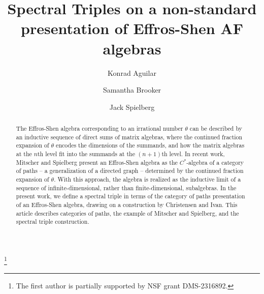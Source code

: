 \documentclass[12pt]{amsart}
\theoremstyle{plain} %
\theoremstyle{definition} %
\begin{document}
\title[Spectral Triples on Effros-Shen algebras]{Spectral Triples on a non-standard presentation of Effros-Shen AF algebras} %


  \author{Konrad Aguilar}
\thanks{The first author is partially supported by NSF grant DMS-2316892.}
\address{Department of Mathematics and Statistics, Pomona College\\610 N College Ave\\Claremont, CA 91711\\USA}
             
 \author{Samantha Brooker}
\address{Department of Mathematics, Virginia Tech\\225 Stanger Street\\Blacksburg, VA\\24061\\USA}

 \author{Jack Spielberg}
\address{School of Mathematical and Statistical Sciences, Arizona State University\\901 S Palm Walk\\Tempe, AZ 85281\\USA}



\maketitle
\begin{abstract}
The Effros-Shen algebra corresponding to an irrational number $\theta$ can be described by an inductive sequence of direct sums of matrix algebras, where the continued fraction expansion of $\theta$ encodes the dimensions of the summands, and how the matrix algebras at the $n$th level fit into the summands at the $(n+1)$th level. In recent work, Mitscher and Spielberg present an Effros-Shen algebra as the $C^*$-algebra of a category of paths -- a generalization of a directed graph -- determined by the continued fraction expansion of $\theta$. With this approach, the algebra is realized as the inductive limit of a sequence of infinite-dimensional, rather than finite-dimensional, subalgebras. In the present work, we define a spectral triple in terms of the category of paths presentation of an Effros-Shen algebra, drawing on a construction by Christensen and Ivan. This article describes categories of paths, the example of Mitscher and Spielberg, and the spectral triple construction.
\end{abstract}
\end{document}
